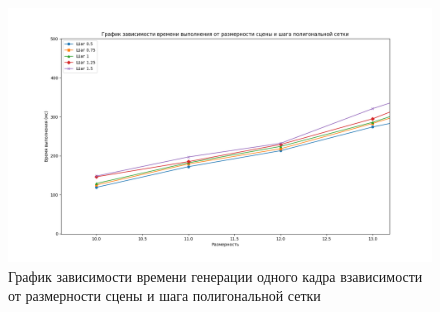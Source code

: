 \begin{figure}[h]
    \centering
    \includegraphics[width=1.1\linewidth]{img/graph1.png}
    \caption{График зависимости времени генерации одного кадра взависимости от размерности сцены и шага полигональной сетки}
    \label{img:graph1}
\end{figure}
\noindent
